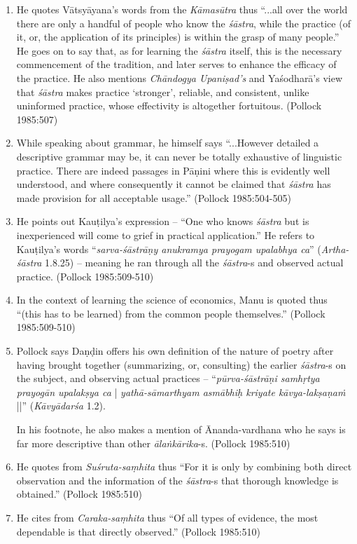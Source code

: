 \begin{enumerate}
\item He quotes Vātsyāyana's words from the {\sl Kāmasūtra} thus ``...all over the world there are only a handful of people who know the {\sl śāstra}, while the practice (of it, or, the application of its principles) is within the grasp of many people.'' He goes on to say that, as for learning the {\sl śāstra} itself, this is the necessary commencement of the tradition, and later serves to enhance the efficacy of the practice. He also mentions {\sl Chāndogya Upaniṣad's} and Yaśodharā's view that {\sl śāstra} makes practice `stronger', reliable, and consistent, unlike uninformed practice, whose effectivity is altogether fortuitous. (Pollock 1985:507)

\item While speaking about grammar, he himself says ``...However detailed a descriptive grammar may be, it can never be totally exhaustive of linguistic practice. There are indeed passages in Pāṇini where this is evidently well understood, and where consequently it cannot be claimed that {\sl śāstra} has made provision for all acceptable usage.'' (Pollock 1985:504-505)

\item He points out Kauṭilya's expression -- ``One who knows {\sl śāstra} but is inexperienced will come to grief in practical application.'' He refers to Kauṭilya's words ``{\sl sarva-śāstrāṇy anukramya prayogam upalabhya ca}'' ({\sl Artha-śāstra} 1.8.25) -- meaning he ran through all the {\sl śāstra}-s and observed actual practice. (Pollock 1985:509-510)

\item In the context of learning the science of economics, Manu is quoted thus ``(this has to be learned) from the common people themselves.'' (Pollock 1985:509-510)

\item Pollock says Daṇḍin offers his own definition of the nature of poetry after having brought together (summarizing, or, consulting) the earlier {\sl śāstra}-s on the subject, and observing actual practices -- ``{\sl pūrva-śāstrāṇi samhṛtya prayogān upalakṣya ca} | {\sl yathā-\break sāmarthyam asmābhiḥ kriyate kāvya-lakṣaṇaṁ} ||'' ({\sl Kāvyādarśa} 1.2).

In his footnote, he also makes a mention of Ānanda-vardhana who he says is far more descriptive than other {\sl ālaṅkārika}-s. (Pollock 1985:510)

\item He quotes from {\sl Suśruta-saṃhita} thus ``For it is only by combining both direct observation and the information of the {\sl śāstra}-s that thorough knowledge is obtained.'' (Pollock 1985:510)

\item He cites from {\sl Caraka-saṃhita} thus ``Of all types of evidence, the most dependable is that directly observed.'' (Pollock 1985:510)
\end{enumerate}

